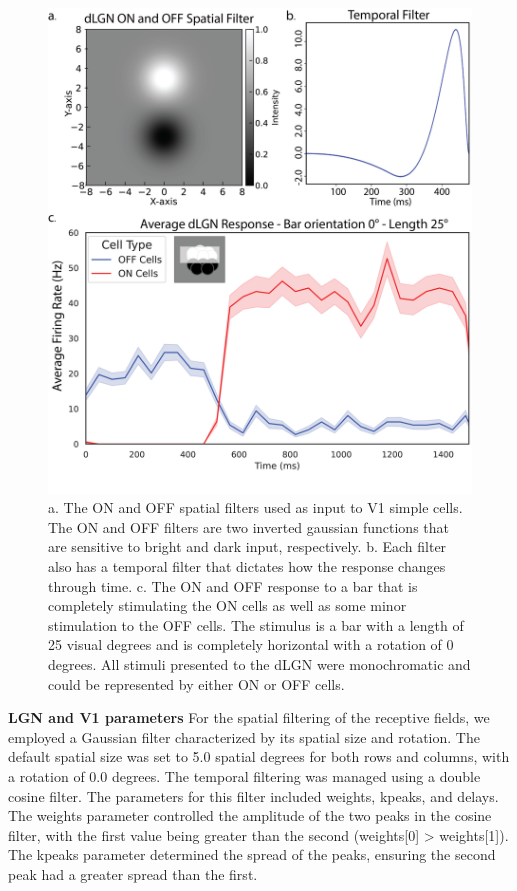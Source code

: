 \documentclass[12pt]{article}
\begin{document}
\begin{figure}[H]
  \centering
  \includegraphics[width=1.0 \textwidth]{figures/lgn_response_fig.png}
  \caption{a. The ON and OFF spatial filters used as input to V1 simple cells. The ON and OFF filters are two inverted gaussian functions that are sensitive to bright and dark input, respectively. b. Each filter also has a temporal filter that dictates how the response changes through time. c. The ON and OFF response to a bar that is completely stimulating the ON cells as well as some minor stimulation to the OFF cells. The stimulus is a bar with a length of 25 visual degrees and is completely horizontal with a rotation of 0 degrees. All stimuli presented to the dLGN were monochromatic and could be represented by either ON or OFF cells.}
  \label{fig:LIF_connectivity}
\end{figure}

\textbf{LGN and V1 parameters} For the spatial filtering of the receptive fields, we employed a Gaussian filter characterized by its spatial size and rotation. The default spatial size was set to 5.0 spatial degrees for both rows and columns, with a rotation of 0.0 degrees. The temporal filtering was managed using a double cosine filter. The parameters for this filter included weights, kpeaks, and delays. The weights parameter controlled the amplitude of the two peaks in the cosine filter, with the first value being greater than the second (weights[0] > weights[1]). The kpeaks parameter determined the spread of the peaks, ensuring the second peak had a greater spread than the first.
\end{document}
